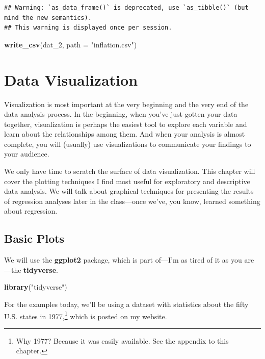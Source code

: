 \documentclass[
  12pt,
  oneside,openany]{book}
\newenvironment{Shaded}{\begin{snugshade}}{\end{snugshade}}
\newcommand{\DataTypeTok}[1]{\textcolor[rgb]{0.13,0.29,0.53}{#1}}
\newcommand{\DecValTok}[1]{\textcolor[rgb]{0.00,0.00,0.81}{#1}}
\newcommand{\KeywordTok}[1]{\textcolor[rgb]{0.13,0.29,0.53}{\textbf{#1}}}
\newcommand{\NormalTok}[1]{#1}
\newcommand{\StringTok}[1]{\textcolor[rgb]{0.31,0.60,0.02}{#1}}
\begin{document}
\begin{verbatim}
## Warning: `as_data_frame()` is deprecated, use `as_tibble()` (but mind the new semantics).
## This warning is displayed once per session.
\end{verbatim}

\begin{Shaded}
\begin{Highlighting}[]
\KeywordTok{write\_csv}\NormalTok{(dat\_}\DecValTok{2}\NormalTok{, }\DataTypeTok{path =} \StringTok{"inflation.csv"}\NormalTok{)}
\end{Highlighting}
\end{Shaded}

\hypertarget{visualization}{%
\chapter{Data Visualization}\label{visualization}}

Visualization is most important at the very beginning and the very end of the data analysis process. In the beginning, when you've just gotten your data together, visualization is perhaps the easiest tool to explore each variable and learn about the relationships among them. And when your analysis is almost complete, you will (usually) use visualizations to communicate your findings to your audience.

We only have time to scratch the surface of data visualization. This chapter will cover the plotting techniques I find most useful for exploratory and descriptive data analysis. We will talk about graphical techniques for presenting the results of regression analyses later in the class---once we've, you know, learned something about regression.

\hypertarget{basic-plots}{%
\section{Basic Plots}\label{basic-plots}}

We will use the \textbf{ggplot2} package, which is part of---I'm as tired of it as you are---the \textbf{tidyverse}.

\begin{Shaded}
\begin{Highlighting}[]
\KeywordTok{library}\NormalTok{(}\StringTok{"tidyverse"}\NormalTok{)}
\end{Highlighting}
\end{Shaded}

For the examples today, we'll be using a dataset with statistics about the fifty U.S. states in 1977,\footnote{Why 1977? Because it was easily available. See the appendix to this chapter.} which is posted on my website.
\end{document}
